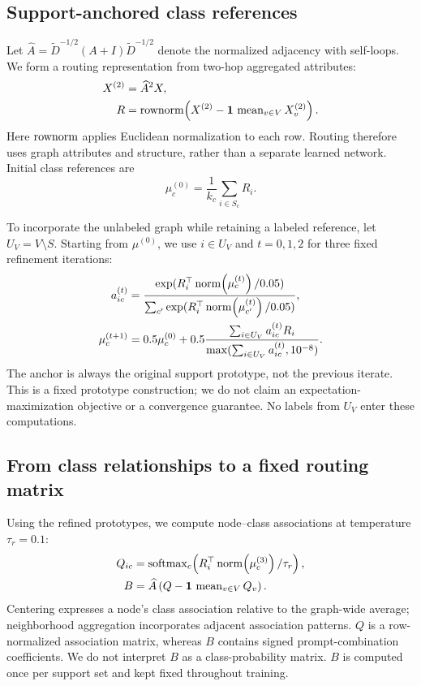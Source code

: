 \subsection{Support-anchored class references}
Let $\widehat A=\widetilde D^{-1/2}(A+I)\widetilde D^{-1/2}$ denote the normalized adjacency with self-loops. We form a routing representation from two-hop aggregated attributes:
\begin{equation}
\begin{aligned}
X^{(2)}&=\widehat A^2X,\\
R&=\operatorname{rownorm}\!\left(X^{(2)}-\mathbf1\,\operatorname{mean}_{v\in V}X^{(2)}_v\right).
\end{aligned}
\label{eq:attributes}
\end{equation}
Here $\operatorname{rownorm}$ applies Euclidean normalization to each row. Routing therefore uses graph attributes and structure, rather than a separate learned network. Initial class references are
\begin{equation}
\mu_c^{(0)}=\frac{1}{k_c}\sum_{i\in S_c}R_i.
\label{eq:anchor}
\end{equation}

To incorporate the unlabeled graph while retaining a labeled reference, let $U_V=V\setminus S$. Starting from $\mu^{(0)}$, we use $i\in U_V$ and $t=0,1,2$ for three fixed refinement iterations:
\begin{align}
a_{ic}^{(t)}&=\frac{\exp(R_i^\top\operatorname{norm}\!\left(\mu_c^{(t)}\right)/0.05)}{\sum_{c'}\exp(R_i^\top\operatorname{norm}\!\left(\mu_{c'}^{(t)}\right)/0.05)},\label{eq:assignment}\\
\mu_c^{(t+1)}&=0.5\mu_c^{(0)}+0.5\frac{\sum_{i\in U_V}a_{ic}^{(t)}R_i}{\max(\sum_{i\in U_V}a_{ic}^{(t)},10^{-8})}.\label{eq:refinement}
\end{align}
The anchor is always the original support prototype, not the previous iterate. This is a fixed prototype construction; we do not claim an expectation-maximization objective or a convergence guarantee. No labels from $U_V$ enter these computations.

\subsection{From class relationships to a fixed routing matrix}
Using the refined prototypes, we compute node--class associations at temperature $\tau_r=0.1$:
\begin{equation}
\begin{aligned}
Q_{ic}&=\operatorname{softmax}_c\!\left(R_i^\top\operatorname{norm}\!\left(\mu_c^{(3)}\right)/\tau_r\right),\\
B&=\widehat A\left(Q-\mathbf1\,\operatorname{mean}_{v\in V}Q_v\right).
\end{aligned}
\label{eq:routing}
\end{equation}
Centering expresses a node's class association relative to the graph-wide average; neighborhood aggregation incorporates adjacent association patterns. $Q$ is a row-normalized association matrix, whereas $B$ contains signed prompt-combination coefficients. We do not interpret $B$ as a class-probability matrix. $B$ is computed once per support set and kept fixed throughout training.

